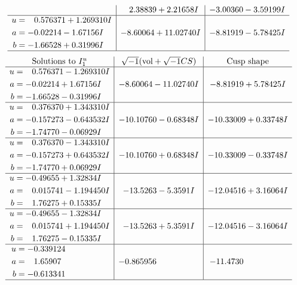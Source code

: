 \documentclass[1p]{elsarticle_modified}
\theoremstyle{definition}
\newcommand{\I}{\sqrt{-1}}
\begin{document}
$$\begin{array}{c|c|c}
 & \phantom{-}2.38839 + 2.21658 I & -3.00360 - 3.59199 I \\ \hline\begin{aligned}
u &= \phantom{-}0.576371 + 1.269310 I \\
a &= -0.02214 - 1.67156 I \\
b &= -1.66528 + 0.31996 I\end{aligned}
 & -8.60064 + 11.02740 I & -8.81919 - 5.78425 I\\
 \hline 
 \end{array}$$\newpage$$\begin{array}{c|c|c}  
\text{Solutions to }I^u_{1}& \I (\text{vol} + \sqrt{-1}CS) & \text{Cusp shape}\\
 \hline 
\begin{aligned}
u &= \phantom{-}0.576371 - 1.269310 I \\
a &= -0.02214 + 1.67156 I \\
b &= -1.66528 - 0.31996 I\end{aligned}
 & -8.60064 - 11.02740 I & -8.81919 + 5.78425 I \\ \hline\begin{aligned}
u &= \phantom{-}0.376370 + 1.343310 I \\
a &= -0.157273 - 0.643532 I \\
b &= -1.74770 - 0.06929 I\end{aligned}
 & -10.10760 - 0.68348 I & -10.33009 + 0.33748 I \\ \hline\begin{aligned}
u &= \phantom{-}0.376370 - 1.343310 I \\
a &= -0.157273 + 0.643532 I \\
b &= -1.74770 + 0.06929 I\end{aligned}
 & -10.10760 + 0.68348 I & -10.33009 - 0.33748 I \\ \hline\begin{aligned}
u &= -0.49655 + 1.32834 I \\
a &= \phantom{-}0.015741 - 1.194450 I \\
b &= \phantom{-}1.76275 + 0.15335 I\end{aligned}
 & -13.5263 - 5.3591 I & -12.04516 + 3.16064 I \\ \hline\begin{aligned}
u &= -0.49655 - 1.32834 I \\
a &= \phantom{-}0.015741 + 1.194450 I \\
b &= \phantom{-}1.76275 - 0.15335 I\end{aligned}
 & -13.5263 + 5.3591 I & -12.04516 - 3.16064 I \\ \hline\begin{aligned}
u &= -0.339124\phantom{ +0.000000I} \\
a &= \phantom{-}1.65907\phantom{ +0.000000I} \\
b &= -0.613341\phantom{ +0.000000I}\end{aligned}
 & -0.865956\phantom{ +0.000000I} & -11.4730\phantom{ +0.000000I}\\
 \hline 
 \end{array}$$\newpage\newpage\renewcommand{\arraystretch}{1}
\end{document}
